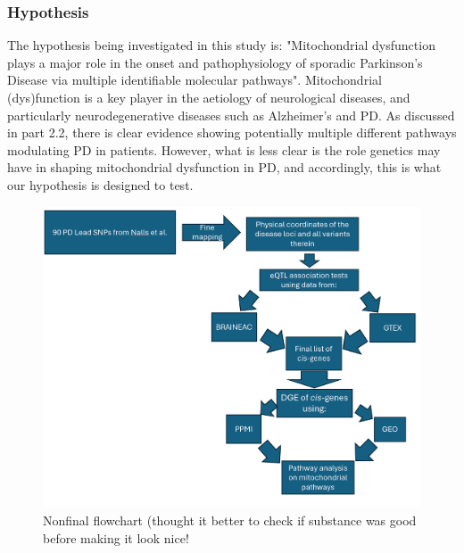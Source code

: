 \documentclass{article}
\begin{document}
\subsubsection{Hypothesis}
The hypothesis being investigated in this study is: "Mitochondrial dysfunction plays a major role in the onset and pathophysiology of sporadic Parkinson’s Disease via multiple identifiable molecular pathways". 
Mitochondrial (dys)function is a key player in the aetiology of neurological diseases\cite{Bartman2024MitochondrialDiseases}, and particularly neurodegenerative diseases such as Alzheimer's and PD\cite{MonzioCompagnoni2020TheDisease}. As discussed in part 2.2, there is clear evidence showing potentially multiple different pathways modulating PD in patients. However, what is less clear is the role genetics may have in shaping mitochondrial dysfunction in PD, and accordingly, this is what our hypothesis is designed to test.
\begin{figure}[h]
    \centering
    \includegraphics[width=1\linewidth]{Thesis/thesis images/Flowchartmockup.png}
    \caption{Nonfinal flowchart (thought it better to check if substance was good before making it look nice!}
    \label{fig:enter-label}
\end{figure}
\end{document}
